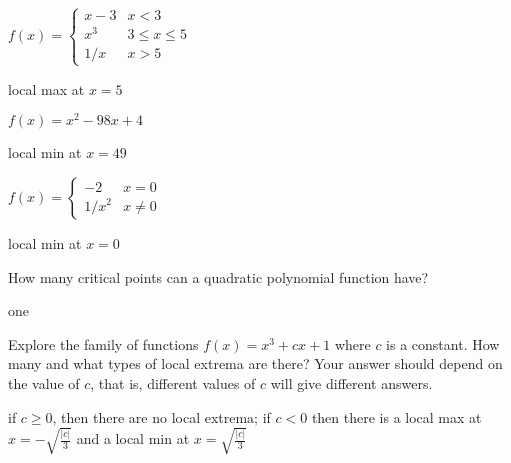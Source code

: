 \begin{exercises}
 \begin{exercise} $f(x) = \begin{cases} x-3 & x < 3  \\
x^3  & 3\leq x \leq 5 \\
1/x  & x>5 \end{cases}$
\begin{answer} local max at $x=5$
\end{answer}\end{exercise}

\begin{exercise} $f(x) = x^2 - 98x + 4$
\begin{answer} local min at $x=49$
\end{answer}\end{exercise}

\begin{exercise} $f(x) =\begin{cases} -2 & x = 0  \\
1/x^2 & x \neq 0 \end{cases}$
\begin{answer} local min at $x=0$
\end{answer}\end{exercise}

\endtwocol

\begin{exercise} How many critical points can a quadratic polynomial function have?
\begin{answer} one
\end{answer}\end{exercise}

\begin{exercise} Explore the family of functions $f(x) = x^3 + cx +1$ where $c$
 is a constant.  How many and what types of local extrema are there?
 Your answer should depend on the value of $c$, that is, different
 values of $c$ will give different answers.
\begin{answer} if $c\ge 0$, then there are no local extrema; 
if $c<0$ then there is a local max at $x=-\sqrt{\frac{|c|}{3}}$ and a
local min at $x=\sqrt{\frac{|c|}{3}}$
\end{answer}\end{exercise}


\end{exercises}









